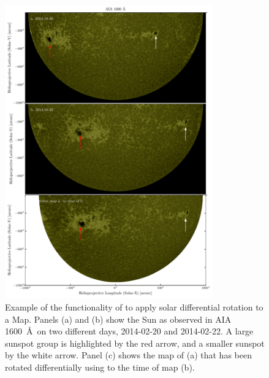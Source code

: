 \begin{figure}
    \center
    \includegraphics[width = 0.8\textwidth]{figures/fig_diff_rot_1600.pdf}
    \caption{Example of the functionality of \sunpypkg to apply solar differential rotation to a Map.
    Panels (a) and (b) show the Sun as observed in AIA 1600~\AA\ on two different days, 2014-02-20 and 2014-02-22.
    A large sunspot group is highlighted by the red arrow, and a smaller sunspot by the white arrow.
    Panel (c) shows the map of (a) that has been rotated differentially using \sunpypkg to the time of map (b).}
    \label{fig:diff_rot}
\end{figure}
